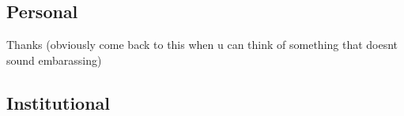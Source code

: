 \subsection*{Personal}

Thanks (obviously come back to this when u can think of something that doesnt sound embarassing)

\subsection*{Institutional}

